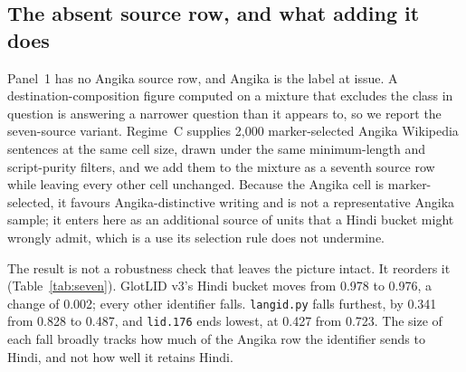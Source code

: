 \documentclass[final]{clv2025}
\newcommand{\lab}[1]{\texttt{#1}}
\newcommand{\fitexhibit}[1]{\sbox{\exhibitbox}{}\ifdim\wd\exhibitbox>\linewidth\resizebox{\linewidth}{!}{\usebox{\exhibitbox}}\else\usebox{\exhibitbox}\fi}
\newcommand{\exhibit}[1]{\fitexhibit{tables/#1.tex}}
\begin{document}
\subsection{The absent source row, and what adding it does}\label{sec:seven}

Panel~1 has no Angika source row, and Angika is the label at issue. A destination-composition figure computed on a mixture that excludes the class in question is answering a narrower question than it appears to, so we report the seven-source variant. Regime~C supplies 2,000 marker-selected Angika Wikipedia sentences at the same cell size, drawn under the same minimum-length and script-purity filters, and we add them to the mixture as a seventh source row while leaving every other cell unchanged. Because the Angika cell is marker-selected, it favours Angika-distinctive writing and is not a representative Angika sample; it enters here as an additional source of units that a Hindi bucket might wrongly admit, which is a use its selection rule does not undermine.

The result is not a robustness check that leaves the picture intact. It reorders it (Table~\ref{tab:seven}). GlotLID v3's Hindi bucket moves from 0.978 to 0.976, a change of 0.002; every other identifier falls. \texttt{langid.py} falls furthest, by 0.341 from 0.828 to 0.487, and \lab{lid.176} ends lowest, at 0.427 from 0.723. The size of each fall broadly tracks how much of the Angika row the identifier sends to Hindi, and not how well it retains Hindi.

\begin{table}[tb]\centering\small\exhibit{seven_language}
\caption{Hindi retention and the Hindi-sourced share of the Hindi-labelled bucket on the six-language Panel 1 sentence mixture and on the same mixture with a seventh marker-selected Angika source row of equal size. Bracketed intervals are 95\% conditional source-resampling intervals preserving the designed cell weights; the OpenLID-v3 row is a later addition to the same mixture and is reported as point estimates. OpenLID-v3 carries no Newari label, which depresses both of its composition figures (Section~\ref{sec:modern}). The final column is the share of the Angika row each identifier assigns to Hindi. The Angika row is marker-selected and is not a representative Angika sample.}
\label{tab:seven}
\end{table}
\end{document}
